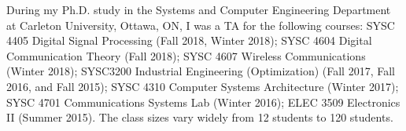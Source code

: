 \documentclass[11pt]{article}
\begin{document}
During my Ph.D. study in the Systems and Computer Engineering Department at Carleton University, Ottawa, ON, I was a TA for the following courses: SYSC 4405 Digital Signal Processing (Fall 2018, Winter 2018); SYSC 4604 Digital Communication Theory (Fall 2018); SYSC 4607 Wireless Communications (Winter 2018); SYSC3200 Industrial Engineering (Optimization) (Fall 2017, Fall 2016, and Fall 2015); SYSC 4310 Computer Systems Architecture (Winter 2017); SYSC 4701 Communications Systems Lab (Winter 2016); ELEC 3509 Electronics II (Summer 2015). The class sizes vary widely from 12 students to 120 students.








   
\end{document}
